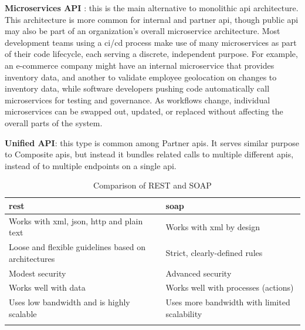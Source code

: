 \begin{multicols}{2}
      \textbf{Microservices API} \label{microservicesapi}: this is the main alternative to monolithic \acrshort{api}
      architecture. This architecture is more common for internal and partner \acrshort{api}, though public \acrshort{api}
      may also be part of an organization's overall microservice architecture. Most development teams using a
      \acrshort{ci}/\acrshort{cd} process make use of many microservices as part of their code lifecycle, each serving a
      discrete, independent purpose. For example, an e-commerce company might have an internal microservice that
      provides inventory data, and another to validate employee geolocation on changes to inventory data, while
      software developers pushing code automatically call microservices for testing and governance. As workflows
      change, individual microservices can be swapped out, updated, or replaced without affecting the overall parts
      of the system.

      \textbf{Unified API}: this type is common among Partner \acrshort{api}s. It serves similar purpose to Composite
      \acrshort{api}s, but instead it bundles related calls to multiple different \acrshort{api}s, instead of to multiple
      endpoints on a single \acrshort{api}.

      \begin{longtable}{|p{8cm}||p{8cm}|}
            \hline
            \rowcolor{blue!20}
            \acrshort{rest}                                                            & \acrshort{soap}                              \\
            \endfirsthead
            \hline
            Works with \acrshort{xml}, \acrshort{json}, \acrshort{http} and plain text & Works with \acrshort{xml} by design          \\
            \hline
            Loose and flexible guidelines based on architectures                       & Strict, clearly-defined rules                \\
            \hline
            Modest security                                                            & Advanced security                            \\
            \hline
            Works well with data                                                       & Works well with processes (actions)          \\
            \hline
            Uses low bandwidth and is highly scalable                                  & Uses more bandwidth with limited scalability \\
            \hline
            \caption{Comparison of REST and SOAP}
            \label{tab:restvsoap}
      \end{longtable}


\end{multicols}
